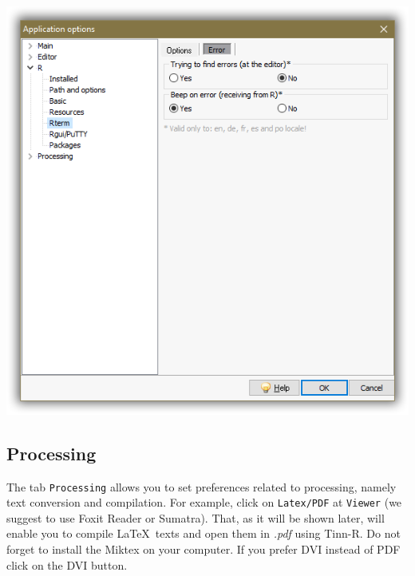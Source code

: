 \includegraphics[scale=0.50]{./res/app_r_rterm_error.png}

\subsection{Processing}

The tab \texttt{Processing} allows you to set preferences related to processing, namely text conversion and compilation.
For example, click on \texttt{Latex/PDF} at \texttt{Viewer} (we suggest to use Foxit Reader or Sumatra).
That, as it will be shown later, will enable you to compile \LaTeX ~texts and open them in \textit{.pdf} using Tinn-R.
Do not forget to install the Miktex on your computer. If you prefer DVI instead of PDF click on the DVI button.

